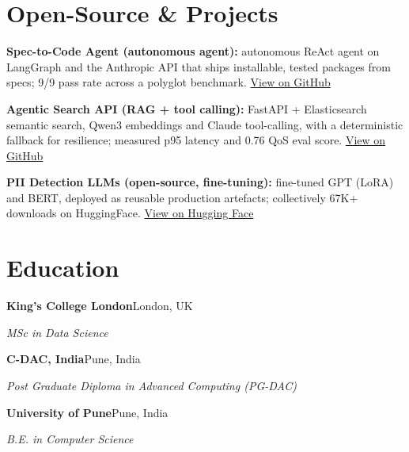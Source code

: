 \documentclass[10pt,a4paper]{article}
\begin{document}
\section{Open-Source \& Projects}
\begin{tight}
  \item \textbf{Spec-to-Code Agent (autonomous agent):} autonomous ReAct agent on LangGraph and the Anthropic API that ships installable, tested packages from specs; 9/9 pass rate across a polyglot benchmark. \href{https://github.com/abhijeetscode/Spec-to-Code-Agent}{View on GitHub}
  \item \textbf{Agentic Search API (RAG + tool calling):} FastAPI + Elasticsearch semantic search, Qwen3 embeddings and Claude tool-calling, with a deterministic fallback for resilience; measured p95 latency and 0.76 QoS eval score. \href{https://github.com/abhijeetscode/search-agent}{View on GitHub}
  \item \textbf{PII Detection LLMs (open-source, fine-tuning):} fine-tuned GPT (LoRA) and BERT, deployed as reusable production artefacts; collectively 67K+ downloads on HuggingFace. \href{https://huggingface.co/ab-ai/pii_model}{View on Hugging Face}
\end{tight}

\section{Education}
{\color{company}\bfseries King's College London}\hfill {\color{muted}London, UK}\par
{\itshape MSc in Data Science}\par\vspace{2pt}
{\color{company}\bfseries C-DAC, India}\hfill {\color{muted}Pune, India}\par
{\itshape Post Graduate Diploma in Advanced Computing (PG-DAC)}\par\vspace{2pt}
{\color{company}\bfseries University of Pune}\hfill {\color{muted}Pune, India}\par
{\itshape B.E. in Computer Science}\par
\end{document}

